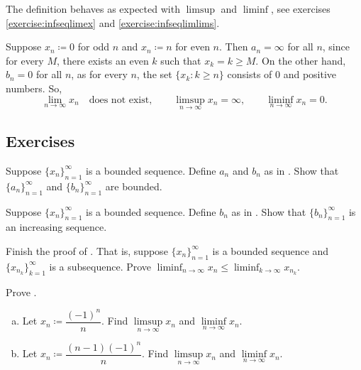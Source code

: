 The definition behaves as expected with
$\limsup$ and $\liminf$, see exercises \ref{exercise:infseqlimex}
and \ref{exercise:infseqlimlims}.

\begin{example}
Suppose
$x_n \coloneqq 0$ for odd $n$ and $x_n \coloneqq n$ for even $n$.
Then $a_n = \infty$ for all $n$, since for every $M$,
there exists an even $k$ such that $x_k = k \geq M$.
On the other hand, $b_n = 0$ for all $n$, as
for every $n$, the set
$\{ x_k : k \geq n \}$ consists of $0$ and positive numbers.
So,
\begin{equation*}
\lim_{n\to \infty} x_n \quad \text{does not exist},
\qquad
\limsup_{n\to \infty} x_n = \infty ,
\qquad
\liminf_{n\to \infty} x_n = 0.
\end{equation*}
\end{example}

\subsection{Exercises}

\begin{exercise}
Suppose $\{ x_n \}_{n=1}^\infty$ is a bounded sequence.  Define $a_n$ and
$b_n$ as in .  Show that $\{ a_n \}_{n=1}^\infty$
and $\{ b_n \}_{n=1}^\infty$ are bounded.
\end{exercise}

\begin{exercise}
Suppose $\{ x_n \}_{n=1}^\infty$ is a bounded sequence.
Define $b_n$ as in .  Show that
$\{ b_n \}_{n=1}^\infty$ is an increasing sequence.
\end{exercise}

\begin{exercise}
Finish the proof of .  That is,
suppose $\{ x_n \}_{n=1}^\infty$ is a bounded sequence and
$\{ x_{n_k} \}_{k=1}^\infty$ is a subsequence.  Prove
$\displaystyle \liminf_{n\to\infty} x_n \leq
\liminf_{k\to\infty} x_{n_k}$.
\end{exercise}

\begin{exercise}
Prove .
\end{exercise}

\begin{exercise}
\leavevmode
\begin{enumerate}[a)]
\item
Let $x_n \coloneqq \dfrac{{(-1)}^n}{n}$.
Find $\limsup\limits_{n\to\infty} x_n$ and $\liminf\limits_{n\to\infty} x_n$.
\item
Let $x_n \coloneqq \dfrac{(n-1){(-1)}^n}{n}$.
Find $\limsup\limits_{n\to\infty} x_n$ and $\liminf\limits_{n\to\infty} x_n$.
\end{enumerate}
\end{exercise}

